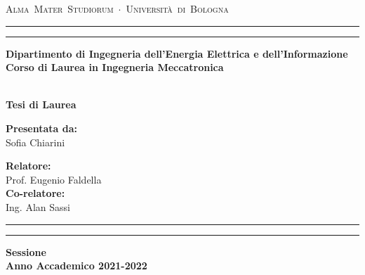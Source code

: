 \documentclass[twoside]{report} %
\begin{document}

\thispagestyle{empty}
\begin{titlepage}
\begin{center}
\hspace{0.1cm}\hbox{\Large{\textsc{Alma Mater Studiorum $\cdot$ Universit\`a di Bologna}}}
\vspace{0.5mm}
\begin{spacing}{0.3}
\rule{14.8cm}{0.5mm}
\rule{14.8cm}{0.2mm}
\end{spacing}
\vspace{10mm}
{\small{\bf Dipartimento di Ingegneria dell'Energia Elettrica e dell'Informazione\\
Corso di Laurea in Ingegneria Meccatronica\\
}}
\vspace{27mm}
\begin{spacing}{1.4}
\\
\vspace{16mm} {\large{\bf Tesi di Laurea}}\vspace{2.5cm}
\end{spacing}
\vspace{47mm}
\par
\noindent
\begin{minipage}[t]{0.49\textwidth}
{\large{\bf Presentata da:\\}
Sofia Chiarini}
\end{minipage}
\hfill
\begin{minipage}[t]{0.49\textwidth}\raggedleft
{\large{\bf Relatore:\\}
Prof. Eugenio Faldella\\
\vspace{4mm}
{\bf Co-relatore:\\}
Ing. Alan Sassi\\
}
\end{minipage}
\vspace{8mm}
\begin{spacing}{0.3}
\rule{14.8cm}{0.2mm}
\rule{14.8cm}{0.5mm}
\end{spacing}
\vspace{5mm}
{\large{\bf Sessione \MakeUppercase{} \\
Anno Accademico 2021-2022}}
\end{center}
\end{titlepage}
\end{document}
